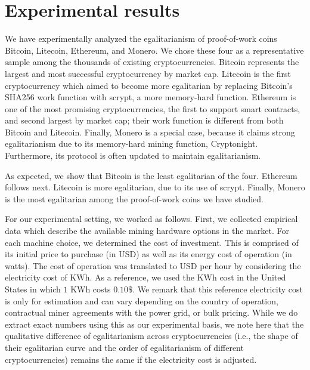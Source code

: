 \section{Experimental results}\label{sec:experiments}

We have experimentally analyzed the egalitarianism of proof-of-work coins
Bitcoin, Litecoin, Ethereum, and Monero. We chose these four as a representative
sample among the thousands of existing cryptocurrencies. Bitcoin represents the
largest and most successful cryptocurrency by market cap. Litecoin is the first
cryptocurrency which aimed to become more egalitarian by replacing Bitcoin's
SHA256 work function with scrypt, a more memory-hard function. Ethereum is one
of the most promising cryptocurrencies, the first to support smart contracts,
and second largest by market cap; their work function is different from both
Bitcoin and Litecoin. Finally, Monero is a special case, because it claims
strong egalitarianism due to its memory-hard mining function, Cryptonight.
Furthermore, its protocol is often updated to maintain egalitarianism.

As expected, we show that Bitcoin is the least egalitarian of the four. Ethereum
follows next. Litecoin is more egalitarian, due to its use of scrypt. Finally,
Monero is the most egalitarian among the proof-of-work coins we have studied.


For our experimental setting, we worked as follows. First, we collected empirical
data which describe the available mining hardware options in the market. For
each machine choice, we determined the cost of investment. This is comprised
of its initial price to purchase (in USD) as well as its energy cost of
operation (in watts). The cost of operation was translated to USD per hour by
considering the electricity cost of KWh. As a reference, we used the KWh cost in
the United States in which $1$ KWh costs $0.10\$$. We remark that this reference
electricity cost is only for estimation and can vary depending on the country of
operation, contractual miner agreements with the power grid, or bulk pricing.
While we do extract exact numbers using this as our experimental basis, we note
here that the qualitative difference of egalitarianism across cryptocurrencies
(i.e., the shape of their egalitarian curve and the order of egalitarianism of
different cryptocurrencies) remains the same if the electricity cost is
adjusted.


